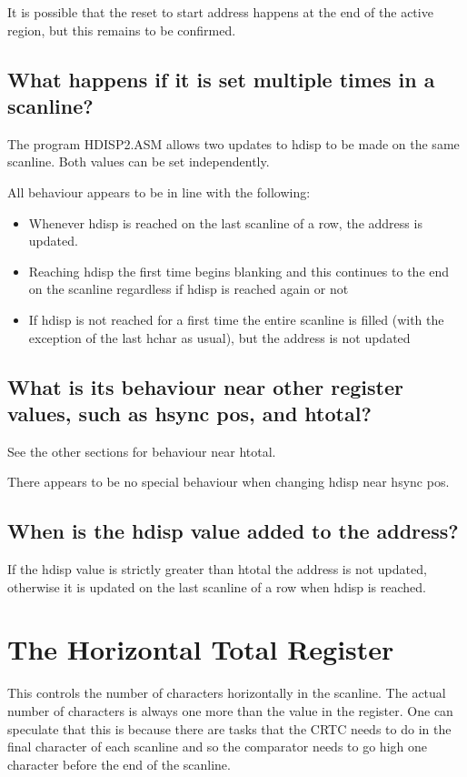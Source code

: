 \documentclass[a4paper,10pt]{amsart}
\begin{document}
It is possible that the reset to start address happens at the end of the active
region, but this remains to be confirmed.

\subsection{What happens if it is set multiple times in a scanline?}

The program HDISP2.ASM allows two updates to hdisp to be made on the same
scanline. Both values can be set independently.

All behaviour appears to be in line with the following:

\begin{itemize}
\item Whenever hdisp is reached on the last scanline of a row, the address is
      updated.
\item Reaching hdisp the first time begins blanking and this continues to the
      end on the scanline regardless if hdisp is reached again or not
\item If hdisp is not reached for a first time the entire scanline is filled
      (with the exception of the last hchar as usual), but the address is not
      updated
\end{itemize}

\subsection{What is its behaviour near other register values, such as hsync pos,
and htotal?}

See the other sections for behaviour near htotal.

There appears to be no special behaviour when changing hdisp near hsync pos.

\subsection{When is the hdisp value added to the address?}

If the hdisp value is strictly greater than htotal the address is not updated,
otherwise it is updated on the last scanline of a row when hdisp is reached.

\section{The Horizontal Total Register}

This controls the number of characters horizontally in the scanline. The actual
number of characters is always one more than the value in the register. One
can speculate that this is because there are tasks that the CRTC needs to do in
the final character of each scanline and so the comparator needs to go high one
character before the end of the scanline.
\end{document}
